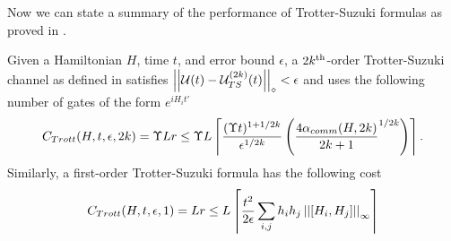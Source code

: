 Now we can state a summary of the performance of Trotter-Suzuki formulas as proved in \cite{childs2021theory}.
\begin{theorem} \label{thm:trotter_cost}
    Given a Hamiltonian $H$, time $t$, and error bound $\epsilon$, a $2k\textsuperscript{th}$-order Trotter-Suzuki channel as defined in  satisfies $\left| \left| \mathcal{U}(t) - {\mathcal{U}_{TS}^{( 2k )}}(t) \right| \right|_\diamond < \epsilon$ and uses the following number of gates of the form $e^{i H_i t'}$
    \begin{equation}
        C_{Trott}(H, t, \epsilon, 2k) = \Upsilon L r \leq \Upsilon L \left\lceil \frac{(\Upsilon t)^{1+1/2k}}{\epsilon^{1/2k}} \left( \frac{4 \alpha_{comm}(H, 2k)}{2k+1}^{1/2k} \right) \right\rceil.
    \end{equation}
    Similarly, a first-order Trotter-Suzuki formula has the following cost
    \begin{equation}
        C_{Trott}(H, t, \epsilon, 1) = L r \leq L \left\lceil \frac{t^2}{2 \epsilon} \sum_{i, j} h_i h_j \left| \left| [H_i, H_j] \right| \right|_{\infty} \right\rceil
    \end{equation}
\end{theorem}
